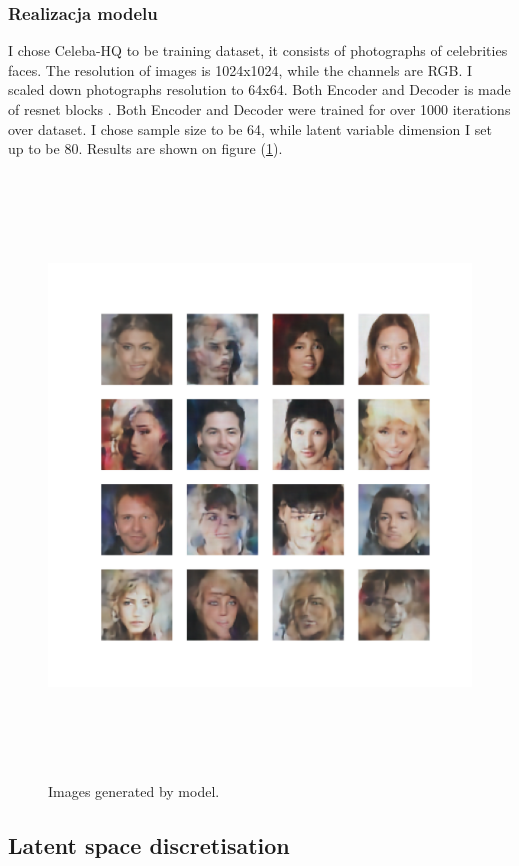 \documentclass[10pt]{article}
\begin{document}
\subsubsection{Realizacja modelu}
I chose Celeba-HQ \cite{celeba_hq} to be training dataset, it consists of photographs of celebrities faces. The resolution of images is 1024x1024, while the channels are RGB. I scaled down photographs resolution to 64x64. Both Encoder and Decoder is made of resnet blocks \cite{resnet_block}.  Both Encoder and Decoder were trained for over 1000 iterations over dataset. I chose sample size to be 64, while latent variable dimension I set up to be 80. Results are shown on figure (\ref{fig:gauss_vae}).
\begin{figure}
\hspace*{-2cm}  
    \centering
    \includegraphics[width = 16cm, height = 16cm]{test_sample_3_it_4.png}
    \caption{Images generated by model.}
    \label{fig:gauss_vae}
\end{figure}
\subsection{Latent space discretisation}
\end{document}
